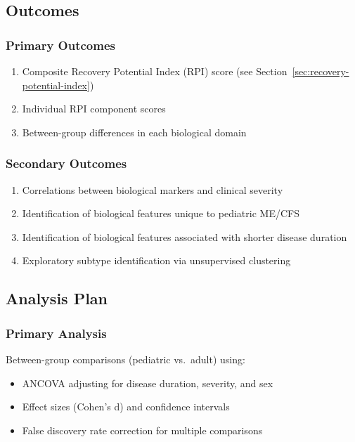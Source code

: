 \subsection{Outcomes}

\subsubsection{Primary Outcomes}
\begin{enumerate}
    \item Composite Recovery Potential Index (RPI) score (see Section~\ref{sec:recovery-potential-index})
    \item Individual RPI component scores
    \item Between-group differences in each biological domain
\end{enumerate}

\subsubsection{Secondary Outcomes}
\begin{enumerate}
    \item Correlations between biological markers and clinical severity
    \item Identification of biological features unique to pediatric ME/CFS
    \item Identification of biological features associated with shorter disease duration
    \item Exploratory subtype identification via unsupervised clustering
\end{enumerate}

\subsection{Analysis Plan}

\subsubsection{Primary Analysis}
Between-group comparisons (pediatric vs.\ adult) using:
\begin{itemize}
    \item ANCOVA adjusting for disease duration, severity, and sex
    \item Effect sizes (Cohen's d) and confidence intervals
    \item False discovery rate correction for multiple comparisons
\end{itemize}

